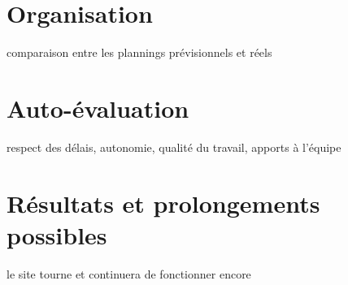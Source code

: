 \section{Organisation}
comparaison entre les plannings prévisionnels et réels



\section{Auto-évaluation}
respect des délais, autonomie, qualité du travail, apports à l'équipe


\section{Résultats et prolongements possibles}
le site tourne et continuera de fonctionner encore

